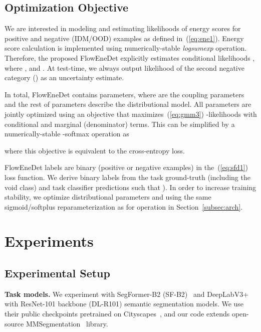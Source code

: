 \documentclass[accepted, startpage]{uai2023}
\begin{document}
\subsection{Optimization Objective}\label{subsec:objective}
We are interested in modeling and estimating likelihoods of energy scores for positive and negative (IDM/OOD) examples as defined in~(\ref{eq:ene1}). Energy score calculation is implemented using numerically-stable \textit{logsumexp} operation. Therefore, the proposed FlowEneDet explicitly estimates conditional likelihoods , where ,  and . At test-time, we always output likelihood of the second negative category () as an uncertainty estimate.

In total, FlowEneDet contains  parameters, where  are the coupling parameters and the rest of parameters describe the distributional model. All parameters are jointly optimized using an objective that maximizes~(\ref{eq:gmm3}) -likelihoods with conditional and marginal (denominator) terms. This can be simplified by a numerically-stable -softmax operation as

where this objective is equivalent to the cross-entropy loss.

FlowEneDet labels  are binary (positive or negative examples) in the~(\ref{eq:sfd1}) loss function. We derive binary labels from the task ground-truth  (including the void class) and task classifier predictions  such that ). In order to increase training stability, we optimize distributional parameters  and  using the same sigmoid/softplus reparameterization as for  operation in Section~\ref{subsec:arch}.

\section{Experiments}
\label{sec:eval}
\subsection{Experimental Setup}
\label{subsec:setup}
\textbf{Task models.} We experiment with SegFormer-B2 (SF-B2)~\citep{xie2021segformer} and DeepLabV3+~\citep{deeplabv3plus2018} with ResNet-101 backbone (DL-R101) semantic segmentation models. We use their public checkpoints pretrained on Cityscapes~\citep{cityscapes}, and our code extends open-source MMSegmentation~\citep{mmseg2020} library.
\end{document}
